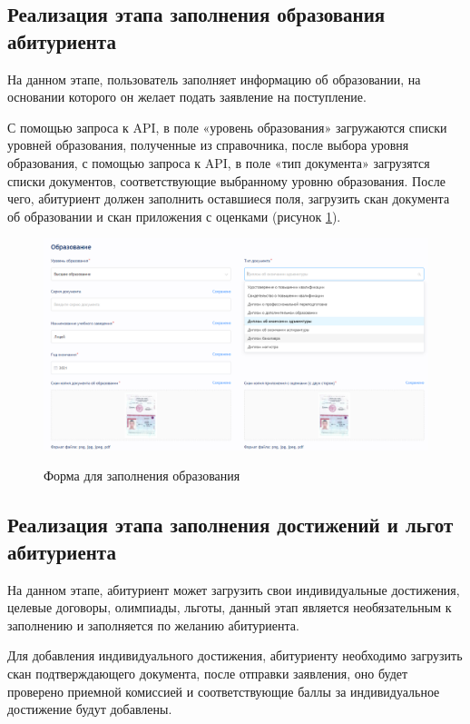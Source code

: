 \subsection{Реализация этапа заполнения образования абитуриента}

На данном этапе, пользователь заполняет информацию об образовании, на основании которого он желает подать заявление на поступление. 

С помощью запроса к API, в поле «уровень образования» загружаются списки уровней образования, полученные из справочника, после выбора уровня образования, с помощью запроса к API, в поле «тип документа» загрузятся списки документов, соответствующие выбранному уровню образования. После чего, абитуриент должен заполнить оставшиеся поля, загрузить скан документа об образовании и скан приложения с оценками (рисунок \ref{fig:educationform}).

\begin{figure}[H]
\begin{center}
\includegraphics[width=0.9\hsize]{fig/edu.png}\\[2mm]
\caption{Форма для заполнения образования}\label{fig:educationform}
\end{center}
\end{figure}

\subsection{Реализация этапа заполнения достижений и льгот абитуриента}

На данном этапе, абитуриент может загрузить свои индивидуальные достижения, целевые договоры, олимпиады, льготы, данный этап является необязательным к заполнению и заполняется по желанию абитуриента.

Для добавления индивидуального достижения, абитуриенту необходимо загрузить скан подтверждающего документа, после отправки заявления, оно будет проверено приемной комиссией и соответствующие баллы за индивидуальное достижение будут добавлены.

